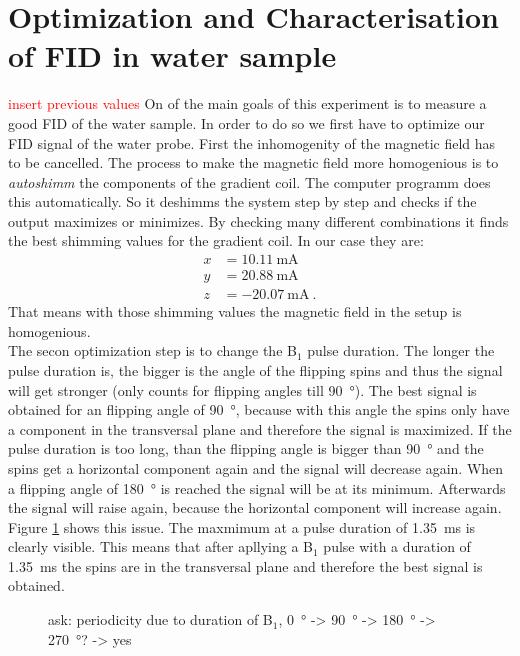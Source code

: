 \section{Optimization and Characterisation of FID in water sample}

\textcolor{red}{insert previous values}
On of the main goals of this experiment is to measure a good FID of the water sample. In order to do so we first have to optimize our FID signal of the water probe.\newline
First the inhomogenity of the magnetic field has to be cancelled. The process to make the magnetic field more homogenious is to \textit{autoshimm} the components of the gradient coil. The computer programm does this automatically. So it deshimms the system step by step and checks if the output maximizes or minimizes. By checking many different combinations it finds the best shimming values for the gradient coil. In our case they are:
\begin{align*}
    x &= \SI{10.11}{\milli \ampere}\\
    y &= \SI{20.88}{\milli \ampere}\\
    z &= \SI{-20.07}{\milli \ampere} \ .
    \label{eq: shimmingvalues}
\end{align*}
That means with those shimming values the magnetic field in the setup is homogenious.
\\
The secon optimization step is to change the B$_1$ pulse duration. The longer the pulse duration is, the bigger is the angle of the flipping spins and thus the signal will get stronger (only counts for flipping angles till \SI{90}{\degree}). The best signal is obtained for an flipping angle of \SI{90}{\degree}, because with this angle the spins only have a component in the transversal plane and therefore the signal is maximized. If the pulse duration is too long, than the flipping angle is bigger than \SI{90}{\degree} and the spins get a horizontal component again and the signal will decrease again. When a flipping angle of \SI{180}{\degree} is reached the signal will be at its minimum. Afterwards the signal will raise again, because the horizontal component will increase again. Figure \ref{fig:B1dauer} shows this issue. The maxmimum at a pulse duration of \SI{1.35}{\milli \second} is clearly visible. This means that after apllying a B$_1$ pulse with a duration of \SI{1.35}{\milli \second} the spins are in the transversal plane and therefore the best signal is obtained.
\begin{figure}[H]
    \centering
    
    \caption[]{ask: periodicity due to duration of B$_1$, \SI{0}{\degree} -> \SI{90}{\degree} -> \SI{180}{\degree} -> \SI{270}{\degree}? -> yes}
    \label{fig:B1dauer}
\end{figure}
